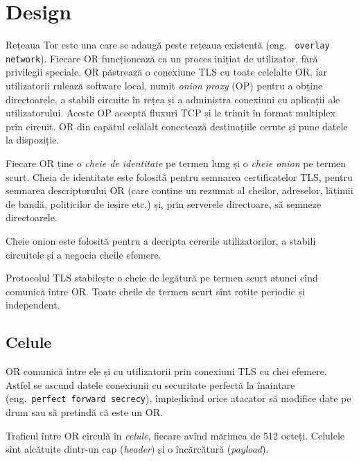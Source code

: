 
\chapter{Design}

\indent\indent Rețeaua Tor este una care se adaugă peste rețeaua existentă (eng.\ %
\texttt{overlay network}).  Fiecare OR funcționează
ca un proces inițiat de utilizator, fără privilegii speciale. OR păstrează
o conexiune TLS cu toate celelalte OR, iar utilizatorii rulează
software local, numit \emph{onion proxy} (OP)  pentru
a obține directoarele, a stabili circuite în rețea și a administra
conexiuni cu aplicații ale utilizatorului. Aceste OP acceptă fluxuri TCP
și le trimit în format multiplex prin circuit. OR din capătul celălalt
conectează destinațiile cerute și pune datele la dispoziție.

Fiecare OR ține o \textit{cheie de identitate} pe termen lung și o \textit{cheie onion}
pe termen scurt.  
Cheia de identitate este folosită pentru semnarea
certificatelor TLS, pentru semnarea descriptorului OR (care conține un
rezumat al cheilor, adreselor, lățimii de bandă, politicilor de ieșire etc.) și,
prin serverele directoare, să semneze directoarele.

Cheie onion este folosită pentru a decripta cererile utilizatorilor, a stabili
circuitele și a negocia cheile efemere.

Protocolul TLS stabilește o cheie de legătură pe termen scurt
atunci cînd comunică între OR. Toate cheile de termen scurt sînt rotite periodic
și independent.

\section{Celule}

\indent\indent OR comunică între ele și cu utilizatorii prin conexiuni TLS cu chei efemere.
Astfel se ascund datele conexiunii cu securitate perfectă la înaintare
(eng.\ \texttt{perfect forward secrecy}), împiedicînd orice atacator să
modifice date pe drum sau să pretindă că este un OR.

Traficul între OR circulă în \emph{celule}, fiecare avînd mărimea de 512 octeți.
Celulele sînt alcătuite dintr-un cap (\emph{header}) și o încărcătură
(\emph{payload}). 

